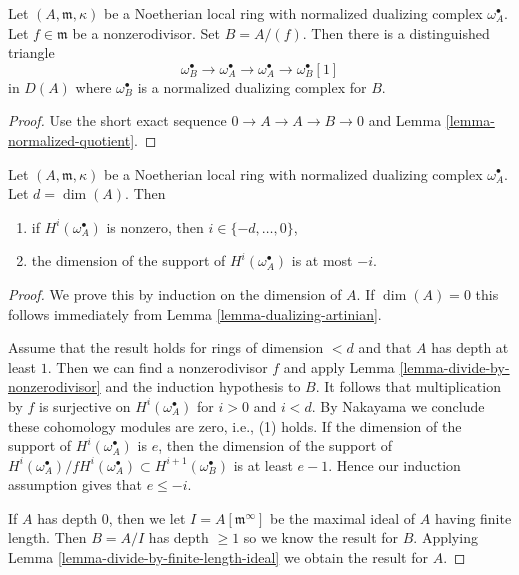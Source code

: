 \begin{lemma}
\label{lemma-divide-by-nonzerodivisor}
Let $(A, \mathfrak m, \kappa)$ be a Noetherian local
ring with normalized dualizing complex $\omega_A^\bullet$.
Let $f \in \mathfrak m$ be a
nonzerodivisor. Set $B = A/(f)$. Then there is a distinguished
triangle
$$
\omega_B^\bullet \to \omega_A^\bullet \to \omega_A^\bullet \to
\omega_B^\bullet[1]
$$
in $D(A)$ where $\omega_B^\bullet$ is a normalized dualizing complex
for $B$.
\end{lemma}

\begin{proof}
Use the short exact sequence $0 \to A \to A \to B \to 0$
and Lemma \ref{lemma-normalized-quotient}.
\end{proof}

\begin{lemma}
\label{lemma-sitting-in-degrees}
Let $(A, \mathfrak m, \kappa)$ be a Noetherian local ring with
normalized dualizing complex $\omega_A^\bullet$. Let $d = \dim(A)$.
Then
\begin{enumerate}
\item if $H^i(\omega_A^\bullet)$ is nonzero, then $i \in \{-d, \ldots, 0\}$,
\item the dimension of the support of $H^i(\omega_A^\bullet)$ is
at most $-i$.
\end{enumerate}
\end{lemma}

\begin{proof}
We prove this by induction on the dimension of $A$.
If $\dim(A) = 0$ this follows immediately from
Lemma \ref{lemma-dualizing-artinian}.

\medskip\noindent
Assume that the result holds for rings of dimension $< d$ and
that $A$ has depth at least $1$. Then we can find a nonzerodivisor
$f$ and apply Lemma \ref{lemma-divide-by-nonzerodivisor}
and the induction hypothesis to $B$.
It follows that multiplication by $f$ is surjective on
$H^i(\omega_A^\bullet)$ for $i > 0$ and $i < d$. By Nakayama
we conclude these cohomology modules are zero, i.e., (1) holds.
If the dimension of the support of $H^i(\omega_A^\bullet)$
is $e$, then the dimension of the support of
$H^i(\omega_A^\bullet)/f H^i(\omega_A^\bullet) \subset
H^{i + 1}(\omega_B^\bullet)$ is at least $e - 1$.
Hence our induction assumption gives that $e \leq -i$.

\medskip\noindent
If $A$ has depth $0$, then we let $I = A[\mathfrak m^\infty]$
be the maximal ideal of $A$ having finite length. Then $B = A/I$
has depth $\geq 1$ so we know the result for $B$. Applying
Lemma \ref{lemma-divide-by-finite-length-ideal}
we obtain the result for $A$.
\end{proof}

